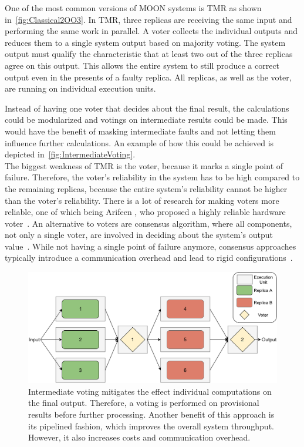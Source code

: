 One of the most common versions of \gls*{MOON} systems is \gls*{TMR} as shown in~\autoref{fig:Classical2OO3}.
In \gls*{TMR}, three replicas are receiving the same input and performing the same work in parallel.
A voter collects the individual outputs and reduces them to a single system output based on majority voting.
The system output must qualify the characteristic that at least two out of the three replicas agree on this output.
This allows the entire system to still produce a correct output even in the presents of a faulty replica.
All replicas, as well as the voter, are running on individual execution units.

Instead of having one voter that decides about the final result, the calculations could be modularized and votings on intermediate results could be made.
This would have the benefit of masking intermediate faults and not letting them influence further calculations.
An example of how this could be achieved is depicted in~\autoref{fig:IntermediateVoting}.
\\

The biggest weakness of \gls*{TMR} is the voter, because it marks a single point of failure.
Therefore, the voter's reliability in the system has to be high compared to the remaining replicas, because the entire system's reliability cannot be higher than the voter's reliability.
There is a lot of research for making voters more reliable, one of which being Arifeen \etal, who proposed a highly reliable hardware voter~\cite{ArifeenFaultTolerantTMR}.
An alternative to voters are consensus algorithm, where all components, not only a single voter, are involved in deciding about the system's output value~\cite{lamport2001paxos}.
While not having a single point of failure anymore, consensus approaches typically introduce a communication overhead and lead to rigid configurations~\cite{GamerIncreasingMOON}.

\begin{figure}[!hb]
	\centering
	\includegraphics[width=0.9\linewidth]{images/IntermediateVoting}
	\caption{Intermediate voting mitigates the effect individual computations on the final output. Therefore, a voting is performed on provisional results before further processing. Another benefit of this approach is its pipelined fashion, which improves the overall system throughput. However, it also increases costs and communication overhead. }
	\label{fig:IntermediateVoting}
\end{figure}

